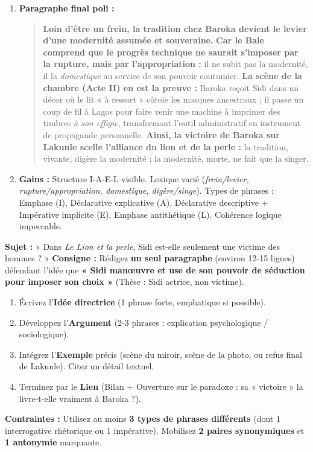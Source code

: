 \documentclass[11pt]{article}
\begin{document}
\begin{exoresolu}
\begin{enumerate}
\begin{itemize}
    \end{itemize}
    \item \textbf{Paragraphe final poli :}
    \begin{quote}
    \textbf{Loin d'être un frein, la tradition chez Baroka devient le levier d'une modernité assumée et souveraine.} \textbf{Car le Bale comprend que le progrès technique ne saurait s'imposer par la rupture, mais par l'appropriation :} il ne subit pas la modernité, il la \emph{domestique} au service de son pouvoir coutumier. \textbf{La scène de la chambre (Acte II) en est la preuve :} Baroka reçoit Sidi dans un décor où le lit « à ressort » côtoie les masques ancestraux ; il passe un coup de fil à Lagos pour faire venir une machine à imprimer des timbres \emph{à son effigie}, transformant l'outil administratif en instrument de propagande personnelle. \textbf{Ainsi, la victoire de Baroka sur Lakunle scelle l'alliance du lion et de la perle :} la tradition, vivante, digère la modernité ; la modernité, morte, ne fait que la singer.
    \end{quote}
    \item \textbf{Gains :} Structure I-A-E-L visible. Lexique varié (\emph{frein/levier, rupture/appropriation, domestique, digère/singe}). Types de phrases : Emphase (I), Déclarative explicative (A), Déclarative descriptive + Impérative implicite (E), Emphase antithétique (L). Cohérence logique impeccable.
\end{enumerate}
\end{exoresolu}

\begin{exercice}
\textbf{Sujet :} « Dans \emph{Le Lion et la perle}, Sidi est-elle seulement une victime des hommes ? »
\textbf{Consigne :} Rédigez \textbf{un seul paragraphe} (environ 12-15 lignes) défendant l'idée que \textbf{« Sidi manœuvre et use de son pouvoir de séduction pour imposer son choix »} (Thèse : Sidi actrice, non victime).
\begin{enumerate}
    \item Écrivez l'\textbf{Idée directrice} (1 phrase forte, emphatique si possible).
    \item Développez l'\textbf{Argument} (2-3 phrases : explication psychologique / sociologique).
    \item Intégrez l'\textbf{Exemple} précis (scène du miroir, scène de la photo, ou refus final de Lakunle). Citez un détail textuel.
    \item Terminez par le \textbf{Lien} (Bilan + Ouverture sur le paradoxe : sa « victoire » la livre-t-elle vraiment à Baroka ?).
\end{enumerate}
\textbf{Contraintes :} Utilisez au moins \textbf{3 types de phrases différents} (dont 1 interrogative rhétorique ou 1 impérative). Mobilisez \textbf{2 paires synonymiques} et \textbf{1 antonymie} marquante.
\end{exercice}
\end{document}
